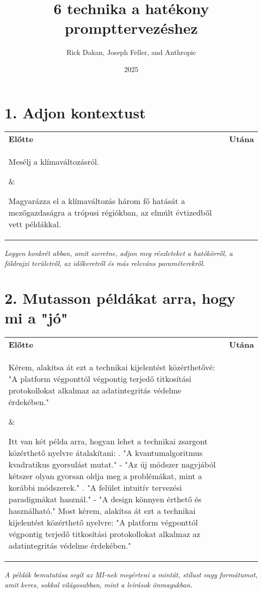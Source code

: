\documentclass[a4paper, 11pt]{article}
\makeatletter
\renewcommand{\maketitle}{
  \begin{center}
    {\fontsize{22}{26}\bfseries\color{primary}\@title}
    \vspace{0.5em}
    {\color{lightgray}\titlerule[3pt]}
    \vspace{1.5em}
  \end{center}
}
\makeatother
\begin{document}
\title{6 technika a hatékony prompttervezéshez}
\author{Rick Dakan, Joseph Feller, and Anthropic}
\date{2025}
\maketitle

\section*{1. Adjon kontextust}
\begin{tabular}{p{} p{}}
\textbf{Előtte} & \textbf{Utána} \\
\parbox[t]{0.45\textwidth}{Mesélj a klímaváltozásról.} & \parbox[t]{0.45\textwidth}{Magyarázza el a klímaváltozás három fő hatását a mezőgazdaságra a trópusi régiókban, az elmúlt évtizedből vett példákkal.} \\
\end{tabular}
\textit{Legyen konkrét abban, amit szeretne, adjon meg részleteket a hatókörről, a földrajzi területről, az időkeretről és más releváns paraméterekről.}

\section*{2. Mutasson példákat arra, hogy mi a "jó"}
\begin{tabular}{p{} p{}}
\textbf{Előtte} & \textbf{Utána} \\
\parbox[t]{0.45\textwidth}{Kérem, alakítsa át ezt a technikai kijelentést közérthetővé: "A platform végponttól végpontig terjedő titkosítási protokollokat alkalmaz az adatintegritás védelme érdekében."} & \parbox[t]{0.45\textwidth}{Itt van két példa arra, hogyan lehet a technikai zsargont közérthető nyelvre átalakítani: . "A kvantumalgoritmus kvadratikus gyorsulást mutat." - "Az új módszer nagyjából kétszer olyan gyorsan oldja meg a problémákat, mint a korábbi módszerek." . "A felület intuitív tervezési paradigmákat használ." - "A design könnyen érthető és használható." \newline Most kérem, alakítsa át ezt a technikai kijelentést közérthető nyelvre: "A platform végponttól végpontig terjedő titkosítási protokollokat alkalmaz az adatintegritás védelme érdekében."} \\
\end{tabular}
\textit{A példák bemutatása segít az MI-nek megérteni a mintát, stílust vagy formátumot, amit keres, sokkal világosabban, mint a leírások önmagukban.}
\end{document}
